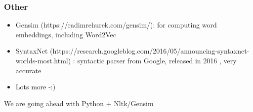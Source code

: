 


\begin{frame}[fragile]\frametitle{Other}
  \begin{itemize}
    \item   Gensim (https://radimrehurek.com/gensim/): for computing word embeddings, including Word2Vec
    \item SyntaxNet (https://research.googleblog.com/2016/05/announcing-syntaxnet-worlds-most.html) : syntactic parser from Google, released in 2016 , very accurate
    \item Lots more -:)
          \end{itemize}
We are going ahead with Python + Nltk/Gensim
\end{frame}
